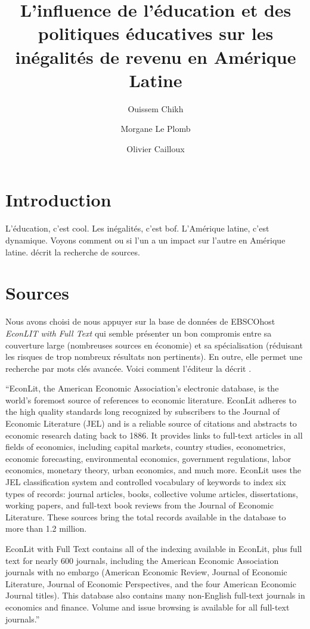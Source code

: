 \documentclass[pagesize, twoside=off, bibliography=totoc, DIV=calc, fontsize=12pt, a4paper, french]{scrartcl}
\title{L’influence de l’éducation et des politiques éducatives sur les inégalités de revenu en Amérique Latine}
\author{Ouissem Chikh}
\author{Morgane Le Plomb}
\author{Olivier Cailloux}
\affil{Université Paris-Dauphine, PSL Research University, CNRS, 75016 PARIS, FRANCE}
\begin{document}
\maketitle
{}
\tableofcontents
\newpage
\setcounter{page}{1}

\section{Introduction}
\label{sec:motiv}
L’éducation, c’est cool.
Les inégalités, c’est bof.
L’Amérique latine, c’est dynamique.
Voyons comment ou si l’un a un impact sur l’autre en Amérique latine.
 décrit la recherche de sources.

\appendix
\section{Sources}
\label{sec_search}
Nous avons choisi de nous appuyer sur la base de données de EBSCOhost \emph{EconLIT with Full Text} qui semble présenter un bon compromis entre sa couverture large (nombreuses sources en économie) et sa spécialisation (réduisant les risques de trop nombreux résultats non pertinents). En outre, elle permet une recherche par mots clés avancée.
Voici comment l’éditeur la décrit \citep{ebscohost_econlit_2024}.

“EconLit, the American Economic Association's electronic database, is the world's foremost source of references to economic literature. EconLit adheres to the high quality standards long recognized by subscribers to the Journal of Economic Literature (JEL) and is a reliable source of citations and abstracts to economic research dating back to 1886. It provides links to full-text articles in all fields of economics, including capital markets, country studies, econometrics, economic forecasting, environmental economics, government regulations, labor economics, monetary theory, urban economics, and much more. EconLit uses the JEL classification system and controlled vocabulary of keywords to index six types of records: journal articles, books, collective volume articles, dissertations, working papers, and full-text book reviews from the Journal of Economic Literature. These sources bring the total records available in the database to more than 1.2 million.

EconLit with Full Text contains all of the indexing available in EconLit, plus full text for nearly 600 journals, including the American Economic Association journals with no embargo (American Economic Review, Journal of Economic Literature, Journal of Economic Perspectives, and the four American Economic Journal titles). This database also contains many non-English full-text journals in economics and finance. Volume and issue browsing is available for all full-text journals.”
\end{document}
